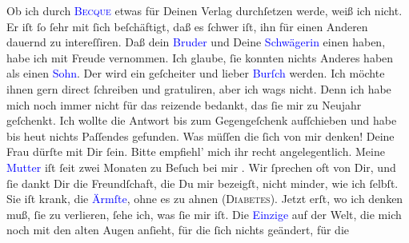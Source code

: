            \pstart
           Ob ich durch \textsc{\textcolor{blue}{Becque}{}\ledrightnote{\textcolor{blue}{Henry Becque}}} etwas für Deinen Verlag durchſetzen werde, weiß ich nicht. Er iſt ſo ſehr mit
               ſich beſchäftigt, daß es ſchwer iſt, ihn für einen Anderen dauernd zu
               intereſſiren.\pend
           \pstart
           Daß dein \textcolor{blue}{Bruder}{} und Deine
                  \textcolor{blue}{Schwägerin}{} einen \label{K_L02741-4v}\label{K_L02741-4h} haben, habe ich mit
               Freude {\pb}vernommen. Ich glaube, ſie konnten nichts
               Anderes haben als einen \textcolor{blue}{Sohn}{}. Der wird ein geſcheiter und lieber \textcolor{blue}{Burſch}{} werden. Ich möchte ihnen gern direct ſchreiben und
               gratuliren, aber ich wags nicht. Denn ich habe mich noch immer nicht für das reizende
                  \label{K_L02741-5v}\label{K_L02741-5h} bedankt, das ſie mir zu Neujahr geſchenkt. Ich
               wollte die Antwort bis zum Gegengeſchenk aufſchieben und habe bis heut nichts Paſſendes gefunden. Was müſſen die ſich von
               mir denken!\pend
           \pstart
           {\pb}Deine Frau \label{K_L02741-6v}\label{K_L02741-6h} dürſte mit Dir ſein. Bitte empfiehl’ mich ihr recht angelegentlich.\pend
           \pstart
           Meine \textcolor{blue}{Mutter}{} iſt ſeit zwei
               Monaten zu Beſuch bei mir . Wir ſprechen oft von
               Dir, und ſie dankt Dir die Freundſchaft, die Du mir bezeigſt, nicht minder, wie ich
               ſelbſt. Sie iſt krank, die \textcolor{blue}{Ärmſte}{}, ohne es zu ahnen (\textsc{Diabetes}). Jetzt erſt,
               wo ich denken muß, ſie zu verlieren, ſehe ich, was ſie mir iſt. Die \textcolor{blue}{Einzige}{} auf der Welt, die mich noch  mit den alten {\pb}Augen anſieht, für die ſich nichts geändert, für die
